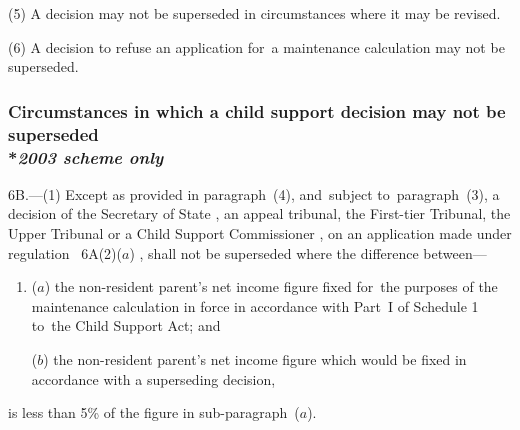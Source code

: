 \documentclass[12pt,a4paper]{article}
\begin{document}
(5) A decision may not be superseded in circumstances where it may be revised.

(6) A decision to refuse an application for~a maintenance calculation may not be superseded.


\subsubsection[6B. Circumstances in which a child support decision may not be superseded]{Circumstances in which a child support decision may not be superseded\\*\emph{2003 scheme only}}

6B.---(1)  Except as provided in paragraph~(4), and~subject to~paragraph~(3), a decision of the 
Secretary of State%
, 
an appeal tribunal, the First-tier Tribunal, the Upper Tribunal or a Child Support Commissioner%
, on an application made under regulation~%
6A(2)($a$)%
, shall not be superseded where the difference between—
\begin{enumerate}\item[]
($a$) the non-resident parent’s net income figure fixed for~the purposes of the maintenance calculation in force in accordance with Part~I of Schedule 1 to~the Child Support Act; and

($b$) the non-resident parent’s net income figure which would be fixed in accordance with a superseding decision,
\end{enumerate}
is less than 5\% of the figure in sub-paragraph~($a$).
\end{document}
